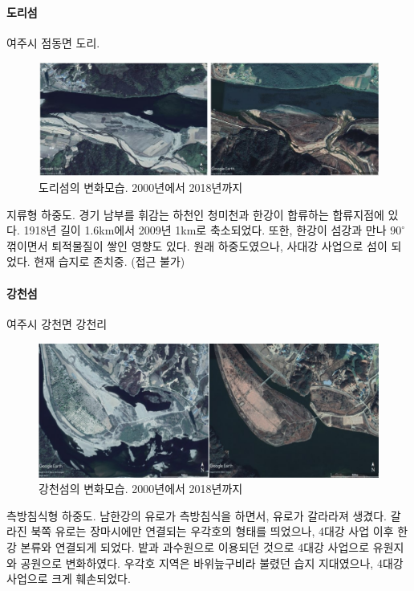 \paragraph{도리섬}
여주시 점동면 도리.

\begin{figure}[ht]
    \centering
    \includegraphics[width=.8\textwidth]{img/도리섬.JPG}
    \caption{도리섬의 변화모습. 2000년에서 2018년까지 }
    \label{fig:my_labe611}
\end{figure}

지류형 하중도. 경기 남부를 휘감는 하천인 청미천과 한강이 합류하는 합류지점에 있다. 1918년 길이 1.6km에서 2009년 1km로 축소되었다.
또한, 한강이 섬강과 만나 $90^\circ$ 꺾이면서 퇴적물질이 쌓인 영향도 있다.
원래 하중도였으나, 사대강 사업으로 섬이 되었다. 현재 습지로 존치중. (접근 불가)

\paragraph{강천섬}
여주시 강천면 강천리

\begin{figure}[ht]
    \centering
    \includegraphics[width=.8\textwidth]{img/강천섬.jpg}
    \caption{강천섬의 변화모습. 2000년에서 2018년까지 }
    \label{fig:my_labe612}
\end{figure}

측방침식형 하중도. 남한강의 유로가 측방침식을 하면서, 유로가 갈라라져 생겼다.
갈라진 북쪽 유로는 장마시에만 연결되는 우각호의 형태를 띄었으나, 4대강 사업 이후 한강 본류와 연결되게 되었다.
밭과 과수원으로 이용되던 것으로 4대강 사업으로 유원지와 공원으로 변화하였다.
우각호 지역은 바위늪구비라 불렸던 습지 지대였으나, 4대강 사업으로 크게 훼손되었다.

